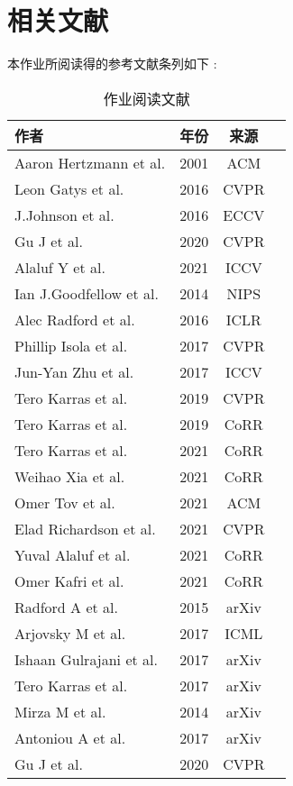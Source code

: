\section{相关文献}

本作业所阅读得的参考文献条列如下 : 


\begin{table*}[htb]
    \centering
    \begin{minipage}[t]{0.55\linewidth} %
        \caption[本作业阅读文献]{作业阅读文献}
        \label{tab:example-table-basic}
        \begin{small}
        \begin{tabular}{@{}lccc@{}}
         \toprule[1.5pt]
        作者 & 年份 & 来源 \\
         \midrule[1pt]
          Aaron Hertzmann et al.\cite{a01} & 2001 & ACM\\
          Leon Gatys et al.\cite{a02} & 2016 & CVPR\\
          J.Johnson et al.\cite{a03} & 2016 & ECCV \\
          Gu J et al.\cite{a04} & 2020 & CVPR \\
          Alaluf Y et al.\cite{a05} & 2021 & ICCV \\
          Ian J.Goodfellow et al.\cite{a06} & 2014 & NIPS \\
          Alec Radford et al.\cite{a07} & 2016 & ICLR\\
          Phillip Isola et al.\cite{a08} & 2017 & CVPR \\
          Jun-Yan Zhu et al.\cite{a09} & 2017 & ICCV \\
          Tero Karras et al.\cite{a10} & 2019 & CVPR \\
          Tero Karras et al.\cite{a11} & 2019 & CoRR \\
          Tero Karras et al.\cite{a12} & 2021 & CoRR \\
          Weihao Xia et al.\cite{a13} & 2021 & CoRR \\
          Omer Tov et al.\cite{a14} & 2021 & ACM \\
          Elad Richardson et al.\cite{a15} & 2021 & CVPR \\
          Yuval Alaluf et al.\cite{a16} & 2021 & CoRR \\
          Omer Kafri et al.\cite{a17} & 2021 & CoRR \\
          Radford A et al.\cite{a18}  & 2015 & arXiv \\
          Arjovsky M et al.\cite{a19}  & 2017 & ICML \\
          Ishaan Gulrajani et al.\cite{a20} & 2017 & arXiv \\
          Tero Karras et al.\cite{a21}  & 2017 & arXiv \\
          Mirza M et al.\cite{a22} & 2014 & arXiv \\
          Antoniou A et al.\cite{a23} & 2017 & arXiv \\
          Gu J et al.\cite{a24} & 2020 & CVPR \\
          \bottomrule[1.5pt]
        \end{tabular}
        \end{small}
    \end{minipage}
\end{table*}

